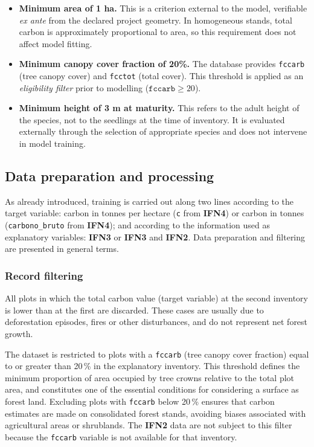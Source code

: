 \begin{itemize}
    \item \textbf{Minimum area of 1 ha.} This is a criterion external to the model, verifiable \emph{ex ante} from the declared project geometry. In homogeneous stands, total carbon is approximately proportional to area, so this requirement does not affect model fitting.

    \item \textbf{Minimum canopy cover fraction of 20\%.} The database provides \texttt{fccarb} (tree canopy cover) and \texttt{fcctot} (total cover). This threshold is applied as an \emph{eligibility filter} prior to modelling ($\texttt{fccarb} \geq 20$).

    \item \textbf{Minimum height of 3 m at maturity.} This refers to the adult height of the species, not to the seedlings at the time of inventory. It is evaluated externally through the selection of appropriate species and does not intervene in model training.
\end{itemize}

\subsection{Data preparation and processing}

As already introduced, training is carried out along two lines according to the target variable: carbon in tonnes per hectare (\texttt{c} from \textbf{IFN4}) or carbon in tonnes (\texttt{carbono\_bruto} from \textbf{IFN4}); and according to the information used as explanatory variables: \textbf{IFN3} or \textbf{IFN3} and \textbf{IFN2}. Data preparation and filtering are presented in general terms.

\subsubsection{Record filtering}\label{subsec:filtradoregistros}

All plots in which the total carbon value (target variable) at the second inventory is lower than at the first are discarded. These cases are usually due to deforestation episodes, fires or other disturbances, and do not represent net forest growth.


The dataset is restricted to plots with a \texttt{fccarb} (tree canopy cover fraction) equal to or greater than 20\,\% in the explanatory inventory. This threshold defines the minimum proportion of area occupied by tree crowns relative to the total plot area, and constitutes one of the essential conditions for considering a surface as forest land. Excluding plots with \texttt{fccarb} below 20\,\% ensures that carbon estimates are made on consolidated forest stands, avoiding biases associated with agricultural areas or shrublands. The \textbf{IFN2} data are not subject to this filter because the \texttt{fccarb} variable is not available for that inventory.


